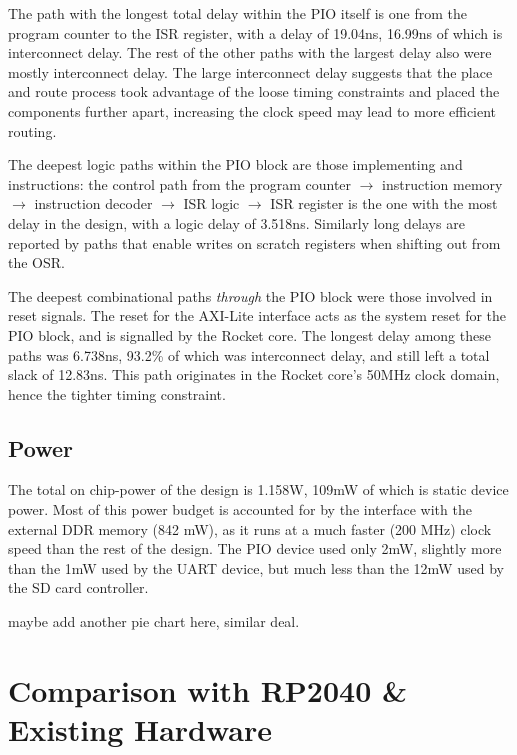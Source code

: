 The path with the longest total delay within the PIO itself is one from the program counter to the ISR register, with a delay of 19.04ns, 16.99ns of which is interconnect delay. The rest of the other paths with the largest delay also were mostly interconnect delay. The large interconnect delay suggests that the place and route process took advantage of the loose timing constraints and placed the components further apart, increasing the clock speed may lead to more efficient routing.

The deepest logic paths within the PIO block are those implementing  and  instructions: the control path from the program counter $\rightarrow$ instruction memory $\rightarrow$ instruction decoder $\rightarrow$ ISR logic $\rightarrow$ ISR register is the one with the most delay in the design, with a logic delay of 3.518ns. Similarly long delays are reported by paths that enable writes on scratch registers when shifting out from the OSR.

The deepest combinational paths \textit{through} the PIO block were those involved in reset signals. The reset for the AXI-Lite interface acts as the system reset for the PIO block, and is signalled by the Rocket core. The longest delay among these paths was 6.738ns, 93.2\% of which was interconnect delay, and still left a total slack of 12.83ns. This path originates in the Rocket core's 50MHz clock domain, hence the tighter timing constraint.

\subsection{Power}

The total on chip-power of the design is 1.158W, 109mW of which is static device power. Most of this power budget is accounted for by the interface with the external DDR memory (842 mW), as it runs at a much faster (200 MHz) clock speed than the rest of the design. The PIO device used only 2mW, slightly more than the 1mW used by the UART device, but much less than the 12mW used by the SD card controller.

maybe add another pie chart here, similar deal.

\section{Comparison with RP2040 \& Existing Hardware}

